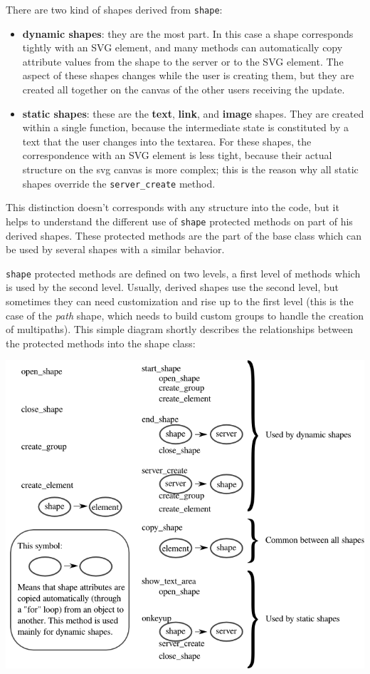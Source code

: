 \documentclass[10pt,a4paper,english]{book}
\begin{document}
There are two kind of shapes derived from \texttt{shape}:
\begin{itemize}
\item {} 
\textbf{dynamic shapes}: they are the most part. In this case a shape
corresponds tightly with an SVG element, and many methods can
automatically copy attribute values from the shape to the server or
to the SVG element. The aspect of these shapes changes while the
user is creating them, but they are created all together on the
canvas of the other users receiving the update.

\item {} 
\textbf{static shapes}: these are the \textbf{text}, \textbf{link}, and \textbf{image}
shapes. They are created within a single function, because the
intermediate state is constituted by a text that the user changes
into the textarea. For these shapes, the correspondence with an SVG
element is less tight, because their actual structure on the svg
canvas is more complex; this is the reason why all static shapes
override the \texttt{server{\_}create} method.

\end{itemize}

This distinction doesn't corresponds with any structure into the code,
but it helps to understand the different use of \texttt{shape} protected
methods on part of his derived shapes. These protected methods are the
part of the base class which can be used by several shapes with a
similar behavior.

\texttt{shape} protected methods are defined on two levels, a first level
of methods which is used by the second level. Usually, derived shapes
use the second level, but sometimes they can need customization and
rise up to the first level (this is the case of the \emph{path} shape,
which needs to build custom groups to handle the creation of
multipaths). This simple diagram shortly describes the relationships
between the protected methods into the shape class:

\includegraphics{images/shape_protected_methods.png}
\end{document}
